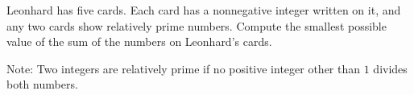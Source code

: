 Leonhard has five cards. Each card has a nonnegative integer written on it, and any two cards show relatively prime numbers. Compute the smallest possible value of the sum of the numbers on Leonhard's cards.

Note: Two integers are relatively prime if no positive integer other than $1$ divides both numbers.

